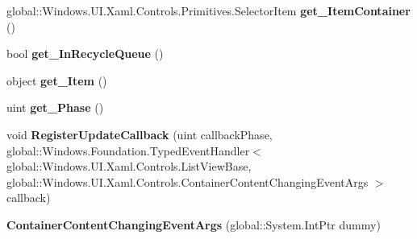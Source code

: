 \begin{DoxyCompactItemize}
\item 
\mbox{\label{class_windows_1_1_u_i_1_1_xaml_1_1_controls_1_1_container_content_changing_event_args_a5fc601b8ea34400cac39f7c694925574}} 
global\+::\+Windows.\+U\+I.\+Xaml.\+Controls.\+Primitives.\+Selector\+Item {\bfseries get\+\_\+\+Item\+Container} ()
\item 
\mbox{\label{class_windows_1_1_u_i_1_1_xaml_1_1_controls_1_1_container_content_changing_event_args_aa88d1a956dccd408c22cd68822cbf018}} 
bool {\bfseries get\+\_\+\+In\+Recycle\+Queue} ()
\item 
\mbox{\label{class_windows_1_1_u_i_1_1_xaml_1_1_controls_1_1_container_content_changing_event_args_adf6a56892a3645903bdbeb798faa1e67}} 
object {\bfseries get\+\_\+\+Item} ()
\item 
\mbox{\label{class_windows_1_1_u_i_1_1_xaml_1_1_controls_1_1_container_content_changing_event_args_a83b5777887886032cce986dfbafd12ac}} 
uint {\bfseries get\+\_\+\+Phase} ()
\item 
\mbox{\label{class_windows_1_1_u_i_1_1_xaml_1_1_controls_1_1_container_content_changing_event_args_af9bbdca8851131ee69d2767595d51531}} 
void {\bfseries Register\+Update\+Callback} (uint callback\+Phase, global\+::\+Windows.\+Foundation.\+Typed\+Event\+Handler$<$ global\+::\+Windows.\+U\+I.\+Xaml.\+Controls.\+List\+View\+Base, global\+::\+Windows.\+U\+I.\+Xaml.\+Controls.\+Container\+Content\+Changing\+Event\+Args $>$ callback)
\item 
\mbox{\label{class_windows_1_1_u_i_1_1_xaml_1_1_controls_1_1_container_content_changing_event_args_a04e2ae3d4530956b6f2478107d6aca2a}} 
{\bfseries Container\+Content\+Changing\+Event\+Args} (global\+::\+System.\+Int\+Ptr dummy)
\item 
\mbox{\label{class_windows_1_1_u_i_1_1_xaml_1_1_controls_1_1_container_content_changing_event_args_a5fc601b8ea34400cac39f7c694925574}} 

\end{DoxyCompactItemize}
